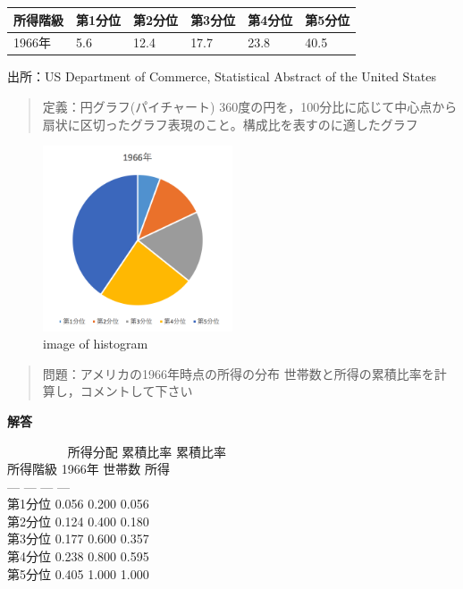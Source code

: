 \documentclass[
]{book}
\theoremstyle{definition}
\theoremstyle{definition}
\theoremstyle{definition}
\theoremstyle{definition}
\theoremstyle{remark}
\begin{document}
\begin{longtable}[]{@{}llllll@{}}
\toprule()
所得階級 & 第1分位 & 第2分位 & 第3分位 & 第4分位 & 第5分位 \\
\midrule()
\endhead
1966年 & 5.6 & 12.4 & 17.7 & 23.8 & 40.5 \\
\bottomrule()
\end{longtable}

出所：US Department of Commerce, Statistical Abstract of the United States

\begin{quote}
定義：円グラフ(パイチャート)
360度の円を，100分比に応じて中心点から扇状に区切ったグラフ表現のこと。構成比を表すのに適したグラフ
\end{quote}

\begin{figure}
\centering
\includegraphics[width=0.5\textwidth,height=\textheight]{images/lec03/fig_us_income_dist1966.png}
\caption{image of histogram}
\end{figure}

\begin{quote}
問題：アメリカの1966年時点の所得の分布
世帯数と所得の累積比率を計算し，コメントして下さい
\end{quote}

\textbf{解答}

~~~~~~~~~\textbar{} 所得分配 \textbar{} 累積比率 \textbar{} 累積比率 \textbar{}\\
所得階級 \textbar{} 1966年 \textbar{} 世帯数 \textbar{} 所得 \textbar{}\\
--- \textbar{} --- \textbar{} --- \textbar{} --- \textbar{}\\
第1分位 \textbar{} 0.056 \textbar{} 0.200 \textbar{} 0.056 \textbar{}\\
第2分位 \textbar{} 0.124 \textbar{} 0.400 \textbar{} 0.180 \textbar{}\\
第3分位 \textbar{} 0.177 \textbar{} 0.600 \textbar{} 0.357 \textbar{}\\
第4分位 \textbar{} 0.238 \textbar{} 0.800 \textbar{} 0.595 \textbar{}\\
第5分位 \textbar{} 0.405 \textbar{} 1.000 \textbar{} 1.000 \textbar{}
\end{document}
